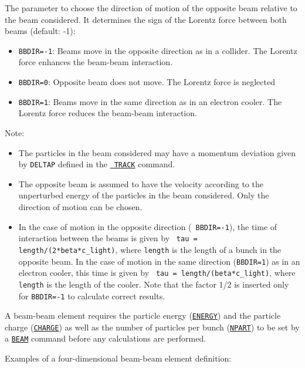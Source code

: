 {\begin{madlist}
    The parameter to choose the direction of motion of the 
     opposite beam relative to the beam considered. It determines 
     the sign of the Lorentz force between both beams (default: -1): 
     \begin{itemize}
        \item  {\tt BBDIR=-1}: Beams move in the opposite direction as in a 
        collider. The Lorentz force enhances the beam-beam interaction. 
        \item  {\tt BBDIR=0}: Opposite beam does not move. The Lorentz force is 
        neglected 
        \item  {\tt BBDIR=1}: Beams move in the same direction as in an 
        electron cooler. The Lorentz force reduces the beam-beam interaction. 
     \end{itemize}
     Note:  
     \begin{itemize}  
        \item  The particles in the beam considered may have a momentum 
        deviation given by {\tt DELTAP} defined in the \hyperref[sec:track]{\tt 
        TRACK} command. 
        \item  The opposite beam is assumed to have the velocity according to 
        the unperturbed energy of the particles in the beam considered. Only 
        the direction of motion can be chosen. 
        \item  In the case of motion in the opposite direction ({\tt 
        BBDIR=-1}), the time of interaction between the beams is given by {\tt 
        tau = length/(2*beta*c\_light)}, where {\tt length} is the length of a 
        bunch in the opposite beam. In the case of motion in the same direction 
        ({\tt BBDIR=1}) as in an electron cooler, this time is given by {\tt 
        tau = length/(beta*c\_light)}, where {\tt length} is the length of the 
        cooler. Note that the factor 1/2 is inserted only for {\tt BBDIR=-1} to 
        calculate correct results. 
     \end{itemize} 
\end{madlist}


A beam-beam element requires the particle energy
(\hyperref[sec:beam]{\tt ENERGY})
and the particle charge
(\hyperref[sec:beam]{\tt CHARGE})
as well as the number of particles per bunch 
(\hyperref[sec:beam]{\tt NPART})
to be set by a \hyperref[sec:beam]{\tt BEAM} command
before any calculations are performed.


Examples of a four-dimensional beam-beam element definition:
 
}
